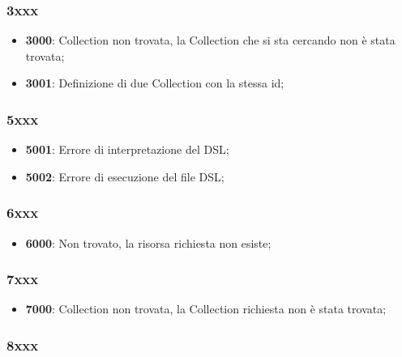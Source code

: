 \subsubsection{3xxx}

\begin{itemize}

	\item \textbf{3000}: Collection non trovata, la Collection che si sta cercando non è stata trovata;
	\item \textbf{3001}: Definizione di due Collection con la stessa id;	

\end{itemize}

\subsubsection{5xxx}

\begin{itemize}

	\item \textbf{5001}: Errore di interpretazione del DSL;
	\item \textbf{5002}: Errore di esecuzione del file DSL;

\end{itemize}

\subsubsection{6xxx}

\begin{itemize}

	\item \textbf{6000}: Non trovato, la risorsa richiesta non esiste;

\end{itemize}

\subsubsection{7xxx}

\begin{itemize}

	\item \textbf{7000}: Collection non trovata, la Collection richiesta non è stata trovata;

\end{itemize}

\subsubsection{8xxx}

